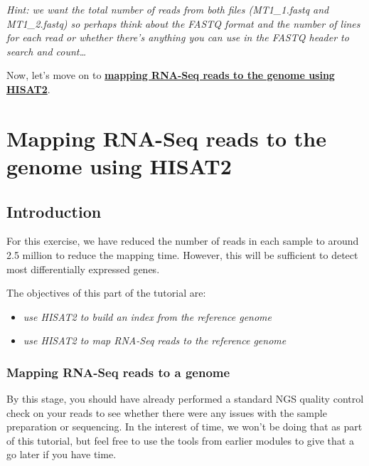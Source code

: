 \documentclass[11pt]{article}
\providecommand{\tightlist}{%
      \setlength{\itemsep}{0pt}\setlength{\parskip}{0pt}}
\begin{document}
\textit{Hint: we want the total number of reads from both files
(MT1\_1.fastq and MT1\_2.fastq) so perhaps think about the FASTQ format
and the number of lines for each read or whether there's anything you
can use in the FASTQ header to search and count\ldots{}}

Now, let's move on to 
\textbf{\href{genome-mapping.ipynb}{mapping RNA-Seq reads to the genome
using HISAT2}}.





\newpage





    \hypertarget{mapping-rna-seq-reads-to-the-genome-using-hisat2}{%
\section{Mapping RNA-Seq reads to the genome using
HISAT2}\label{mapping-rna-seq-reads-to-the-genome-using-hisat2}}

    \hypertarget{introduction}{%
\subsection{Introduction}\label{introduction}}

For this exercise, we have reduced the number of reads in each sample to
around 2.5 million to reduce the mapping time. However, this will be
sufficient to detect most differentially expressed genes.

The objectives of this part of the tutorial are:

\begin{itemize}
\tightlist
\item
  \textit{use HISAT2 to build an index from the reference genome}
\item
  \textit{use HISAT2 to map RNA-Seq reads to the reference genome}
\end{itemize}

    \hypertarget{mapping-rna-seq-reads-to-a-genome}{%
\subsubsection{Mapping RNA-Seq reads to a
genome}\label{mapping-rna-seq-reads-to-a-genome}}

By this stage, you should have already performed a standard NGS quality
control check on your reads to see whether there were any issues with
the sample preparation or sequencing. In the interest of time, we won't
be doing that as part of this tutorial, but feel free to use the tools
from earlier modules to give that a go later if you have time.
\end{document}
